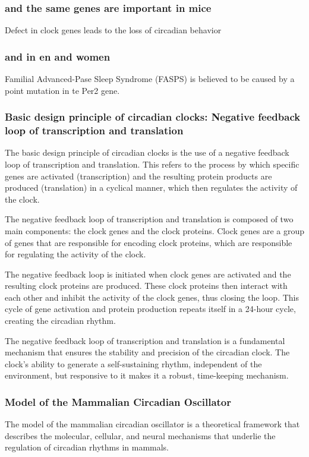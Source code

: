\begin{itemize}
\begin{itemize}
\subsubsection{and the same genes are important in mice}
Defect in clock genes leads to the loss of circadian behavior

\subsubsection{and in en and women}
Familial Advanced-Pase Sleep Syndrome (FASPS) is believed to be caused by a point mutation in te Per2 gene. 

\subsubsection{Basic design principle of circadian clocks: Negative feedback loop of transcription and translation}
The basic design principle of circadian clocks is the use of a negative feedback loop of transcription and translation. This refers to the process by which specific genes are activated (transcription) and the resulting protein products are produced (translation) in a cyclical manner, which then regulates the activity of the clock.

The negative feedback loop of transcription and translation is composed of two main components: the clock genes and the clock proteins. Clock genes are a group of genes that are responsible for encoding clock proteins, which are responsible for regulating the activity of the clock.

The negative feedback loop is initiated when clock genes are activated and the resulting clock proteins are produced. These clock proteins then interact with each other and inhibit the activity of the clock genes, thus closing the loop. This cycle of gene activation and protein production repeats itself in a 24-hour cycle, creating the circadian rhythm.

The negative feedback loop of transcription and translation is a fundamental mechanism that ensures the stability and precision of the circadian clock. The clock's ability to generate a self-sustaining rhythm, independent of the environment, but responsive to it makes it a robust, time-keeping mechanism.

\subsubsection{Model of the Mammalian Circadian Oscillator}
The model of the mammalian circadian oscillator is a theoretical framework that describes the molecular, cellular, and neural mechanisms that underlie the regulation of circadian rhythms in mammals.


\end{itemize}
\end{itemize}
